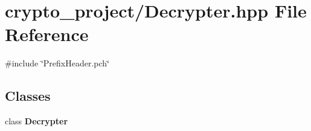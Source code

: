 \section{crypto\+\_\+project/\+Decrypter.hpp File Reference}
\label{_decrypter_8hpp}
{\ttfamily \#include \char`\"{}Prefix\+Header.\+pch\char`\"{}}\newline
\subsection*{Classes}
\begin{DoxyCompactItemize}
\item 
class \textbf{ Decrypter}
\end{DoxyCompactItemize}
